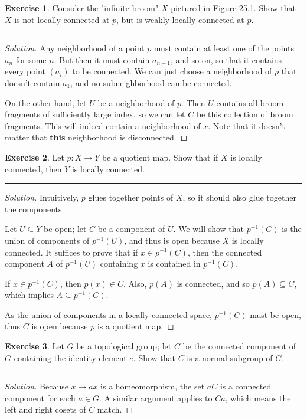 \documentclass{article}
\theoremstyle{definition}
\newtheorem{exercise}{Exercise}[section]
\begin{document}
\pagebreak

\begin{exercise}
  Consider the "infinite broom" $X$ pictured in Figure 25.1. Show that $X$ is not locally connected at $p$, but is weakly locally connected at $p$.
\end{exercise}
\hrule
\begin{proof}[Solution]
  Any neighborhood of a point $p$ must contain at least one of the points $a_n$ for some $n$. But then it must contain $a_{n-1}$, and so on, so that it contains every point $(a_i)$ to be connected. We can just choose a neighborhood of $p$ that doesn't contain $a_1$, and no subneighborhood can be connected.

  On the other hand, let $U$ be a neighborhood of $p$. Then $U$ contains all broom fragments of sufficiently large index, so we can let $C$ be this collection of broom fragments. This will indeed contain a neighborhood of $x$. Note that it doesn't matter that \textbf{this} neighborhood is disconnected.
\end{proof}

\pagebreak

\begin{exercise}
  Let $p:X\to Y$ be a quotient map. Show that if $X$ is locally connected, then $Y$ is locally connected.
\end{exercise}
\hrule
\begin{proof}[Solution]
  Intuitively, $p$ glues together points of $X$, so it should also glue together the components.

  Let $U\subseteq Y$ be open; let $C$ be a component of $U$. We will show that $p^{-1}(C)$ is the union of components of $p^{-1}(U)$, and thus is open because $X$ is locally connected. It suffices to prove that if $x\in p^{-1}(C)$, then the connected component $A$ of $p^{-1}(U)$ containing $x$ is contained in $p^{-1}(C)$.

  If $x\in p^{-1}(C)$, then $p(x)\in C$. Also, $p(A)$ is connected, and so $p(A)\subseteq C$, which implies $A\subseteq p^{-1}(C)$.

  As the union of components in a locally connected space, $p^{-1}(C)$ must be open, thus $C$ is open because $p$ is a quotient map.
\end{proof}

\pagebreak

\begin{exercise}
  Let $G$ be a topological group; let $C$ be the connected component of $G$ containing the identity element $e$. Show that $C$ is a normal subgroup of $G$.
\end{exercise}
\hrule
\begin{proof}[Solution]
  Because $x\mapsto ax$ is a homeomorphism, the set $aC$ is a connected component for each $a\in G$. A similar argument applies to $Ca$, which means the left and right cosets of $C$ match.
\end{proof}
\end{document}
